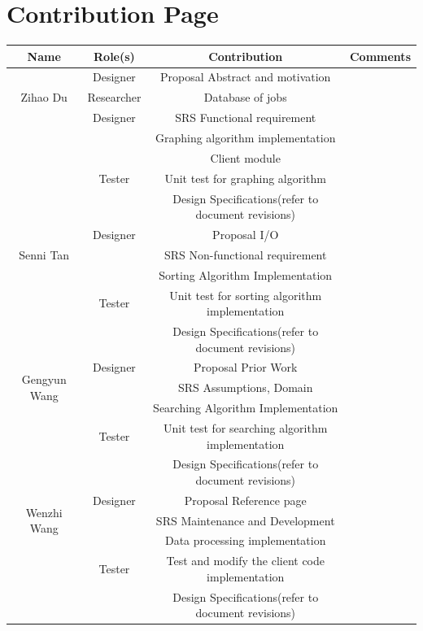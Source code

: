 \documentclass[12pt]{article}
\begin{document}
\section*{Contribution Page}

\begin{center}
\begin{tabular}{ |c|c|c|c| } 
\hline
Name & Role(s) & Contribution & Comments \\
\hline
\multirow{3}{4em}{Zihao Du} & Designer & Proposal Abstract and motivation & \\ 
& Researcher & Database of jobs & \\ 
& Designer & SRS Functional requirement  & \\ 
& ~ & Graphing algorithm implementation & \\
& ~ & Client module & \\
& Tester & Unit test for graphing algorithm & \\
& ~ & Design Specifications(refer to document revisions) & \\
\hline
\multirow{3}{4em}{Senni Tan} & Designer & Proposal I/O& \\ 
& ~ & SRS Non-functional requirement  & \\ 
& ~ & Sorting Algorithm Implementation & \\
& Tester & Unit test for sorting algorithm implementation & \\
& ~ & Design Specifications(refer to document revisions) & \\
\hline
\multirow{3}{4em}{Gengyun Wang} & Designer & Proposal Prior Work& \\ 
& ~ & SRS Assumptions, Domain  & \\ 
& ~ & Searching Algorithm Implementation & \\
& Tester & Unit test for searching algorithm implementation & \\
& ~ & Design Specifications(refer to document revisions) & \\
\hline
\multirow{3}{4em}{Wenzhi Wang} & Designer & Proposal Reference page& \\ 
& ~ & SRS  Maintenance and Development & \\ 
& ~ & Data processing implementation & \\
& Tester & Test and modify the client code implementation & \\
& ~ & Design Specifications(refer to document revisions) & \\
\hline
\end{tabular}
\end{center}
\end{document}
